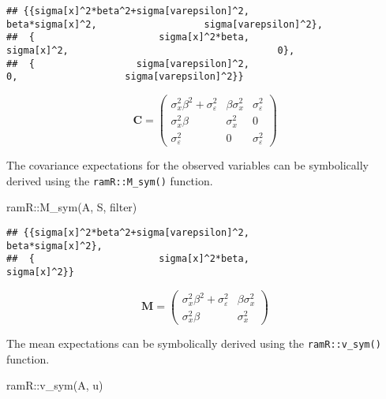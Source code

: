 \documentclass[
]{book}
\newenvironment{Shaded}{\begin{snugshade}}{\end{snugshade}}
\newcommand{\FunctionTok}[1]{\textcolor[rgb]{0.00,0.00,0.00}{#1}}
\newcommand{\NormalTok}[1]{#1}
\newcommand{\SpecialCharTok}[1]{\textcolor[rgb]{0.00,0.00,0.00}{#1}}
\theoremstyle{definition}
\theoremstyle{definition}
\theoremstyle{definition}
\theoremstyle{remark}
\begin{document}
\begin{verbatim}
## {{sigma[x]^2*beta^2+sigma[varepsilon]^2,                       beta*sigma[x]^2,                   sigma[varepsilon]^2},
##  {                      sigma[x]^2*beta,                            sigma[x]^2,                                     0},
##  {                  sigma[varepsilon]^2,                                     0,                   sigma[varepsilon]^2}}
\end{verbatim}

\begin{equation*}\mathbf{C} =\left( \begin{array}{ccc} \sigma  _{x} ^{2} \beta  ^{2} + \sigma  _{\varepsilon } ^{2} & \beta  \sigma  _{x} ^{2} & \sigma  _{\varepsilon } ^{2} \\ \sigma  _{x} ^{2} \beta  & \sigma  _{x} ^{2} & 0 \\ \sigma  _{\varepsilon } ^{2} & 0 & \sigma  _{\varepsilon } ^{2} \end{array} \right)\end{equation*}

The covariance expectations for the observed variables
can be symbolically derived using the \texttt{ramR::M\_sym()} function.

\begin{Shaded}
\begin{Highlighting}[]
\NormalTok{ramR}\SpecialCharTok{::}\FunctionTok{M\_sym}\NormalTok{(A, S, filter)}
\end{Highlighting}
\end{Shaded}

\begin{verbatim}
## {{sigma[x]^2*beta^2+sigma[varepsilon]^2,                       beta*sigma[x]^2},
##  {                      sigma[x]^2*beta,                            sigma[x]^2}}
\end{verbatim}

\begin{equation*}\mathbf{M} =\left( \begin{array}{cc} \sigma  _{x} ^{2} \beta  ^{2} + \sigma  _{\varepsilon } ^{2} & \beta  \sigma  _{x} ^{2} \\ \sigma  _{x} ^{2} \beta  & \sigma  _{x} ^{2} \end{array} \right)\end{equation*}

The mean expectations
can be symbolically derived using the \texttt{ramR::v\_sym()} function.

\begin{Shaded}
\begin{Highlighting}[]
\NormalTok{ramR}\SpecialCharTok{::}\FunctionTok{v\_sym}\NormalTok{(A, u)}
\end{Highlighting}
\end{Shaded}
\end{document}
